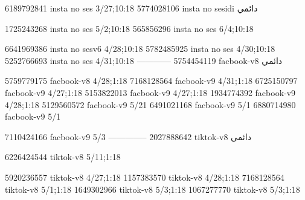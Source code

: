 
6189792841 insta no ses
3/27;10:18
5774028106 insta no sesidi
دائمي


1725243268 insta no ses
5/2;10:18
565856296 insta no ses
6/4;10:18

6641969386 insta no sesv6
4/28;10:18
5782485925 insta no ses
4/30;10:18
5252766693 insta no ses
4/31;10:18
------------
5754454119 facbook-v8
دائمي

5759779175 facbook-v8
4/28;1:18
7168128564 facbook-v9
4/31;1:18
6725150797 facbook-v9
4/27;1:18
5153822013 facbook-v9
4/27;1:18
1934774392 facbook-v9
4/28;1:18
5129560572 facbook-v9
5/21
6491021168 facbook-v9
5/1
6880714980 facbook-v9
5/1

7110424166 facbook-v9
5/3
--------------
2027888642 tiktok-v8
دائمي

6226424544 tiktok-v8
5/11;1:18

5920236557 tiktok-v8
4/27;1:18
1157383570 tiktok-v8
4/28;1:18
7168128564 tiktok-v8
5/1;1:18
1649302966 tiktok-v8
5/3;1:18
1067277770 tiktok-v8
5/3;1:18
